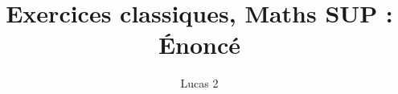 \documentclass[10pt]{article}
\title{Exercices classiques, Maths SUP : Énoncé}
\author{Lucas 2}
\date{ }
\begin{document}
\renewcommand*\contentsname{Sommaire}
\maketitle
\setcounter{tocdepth}{3}
\tableofcontents





\end{document}
